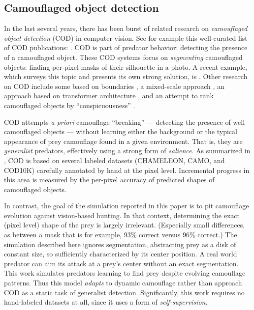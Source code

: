 \documentclass[acmtog]{acmart}
\newcommand{\jargon}[1]{\textit{#1}}
\begin{document}
\subsection{Camouflaged object detection}
In the last several years, there has been burst of related research on \jargon{camouflaged object detection} (COD) in computer vision. See for example this well-curated list of COD publications: \citet{visionxiang_cod}. COD is part of predator behavior: detecting the presence of a camouflaged object. These COD systems focus on \jargon{segmenting} camouflaged objects: finding per-pixel masks of their silhouette in a photo. A recent example, which surveys this topic and presents its own strong solution, is \citet{Zhang2022}. Other research on COD include some based on boundaries \cite{chen_boundary-guided_2022} \cite{sun_boundary-guided_2022}, a mixed-scale approach \cite{pang_zoom_2022}, an approach based on transformer architecture \cite{yin_camoformer_2022}, and an attempt to rank camouflaged objects by “conspicuousness” \cite{lv_cod_2022}.
\par
COD attempts \textit{a priori} camouflage “breaking” — detecting the presence of well camouflaged objects — without learning either the background or the typical appearance of prey camouflage found in a given environment. That is, they are \jargon{generalist} predators, effectively using a strong form of \jargon{salience}. As summarized in \citet{Zhang2022}, COD is based on several labeled datasets (CHAMELEON, CAMO, and COD10K) carefully annotated by hand at the pixel level. Incremental progress in this area is measured by the per-pixel accuracy of predicted shapes of camouflaged objects.
\par
In contrast, the goal of the simulation reported in this paper is to pit camouflage evolution against vision-based hunting. In that context, determining the exact (pixel level) shape of the prey is largely irrelevant. (Especially small differences, as between a mask that is for example, 93\% correct versus 96\% correct.) The simulation described here ignores segmentation, abstracting prey as a disk of constant size, so sufficiently characterized by its center position. A real world predator can aim its attack at a prey's center without an exact segmentation. This work simulates predators learning to find prey despite evolving camouflage patterns. Thus this model \jargon{adapts} to dynamic camouflage rather than approach COD as a static task of generalist detection. Significantly, this work requires no hand-labeled datasets at all, since it uses a form of \jargon{self-supervision}.
\par
\end{document}
